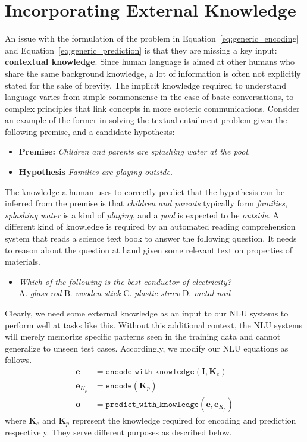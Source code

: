 \section{Incorporating External Knowledge}
\label{sec:intro_external_knowledge}
An issue with the formulation of the problem in Equation~\ref{eq:generic_encoding} and Equation~\ref{eq:generic_prediction} is that they are missing a key input: \textbf{contextual knowledge}. 
Since human language is aimed at other humans who share 
the same background knowledge, a lot of information is often not explicitly stated
for the sake of brevity. The implicit knowledge required to understand language varies 
from simple commonsense in the case of basic conversations, to complex principles that link 
concepts in more esoteric communications. Consider an example of the former in solving the 
textual entailment problem given the following premise, and a candidate hypothesis:
\begin{itemize}
 \item \textbf{Premise:} \textit{Children and parents are splashing water at the pool.}
 \item \textbf{Hypothesis} \textit{Families are playing outside.}
\end{itemize}
The knowledge a human uses to correctly predict that the hypothesis can be inferred from the 
premise is that \textit{children and parents} typically form \textit{families}, \textit{splashing water} 
is a kind of \textit{playing}, and a \textit{pool} is expected to be \textit{outside}. A different kind of knowledge 
is required by an  automated reading comprehension system that reads a science text book to answer the following 
question. It needs to reason about the question at hand given some relevant text on properties of materials.
\begin{itemize}
 \item \textit{Which of the following is the best conductor of electricity?}\\ 
  A. \textit{glass rod}  B. \textit{wooden stick}  C. \textit{plastic straw} D. \textit{metal nail}
\end{itemize}

Clearly, we need some external knowledge as an input to our NLU systems to perform well at tasks like this.
Without this additional context, the NLU systems will merely memorize specific patterns seen in the training data
and cannot generalize to unseen test cases. Accordingly, we modify our NLU equations as follows.
\begin{align}
 \mathbf{e} &= \mathtt{encode\_with\_knowledge}(\mathbf{I}, \mathbf{K}_e) \label{eq:encoding_with_knowledge}\\
 \mathbf{e}_{K_p} &= \mathtt{encode}(\mathbf{K}_p) \\ \label{eq:knowledge_encoding}
 \mathbf{o} &= \mathtt{predict\_with\_knowledge}(\mathbf{e}, \mathbf{e}_{K_p}) \label{eq:prediction_with_knowledge}
\end{align}
where $\mathbf{K}_e$ and $\mathbf{K}_p$ represent the knowledge required for encoding and prediction respectively. 
They serve different purposes as described below.


